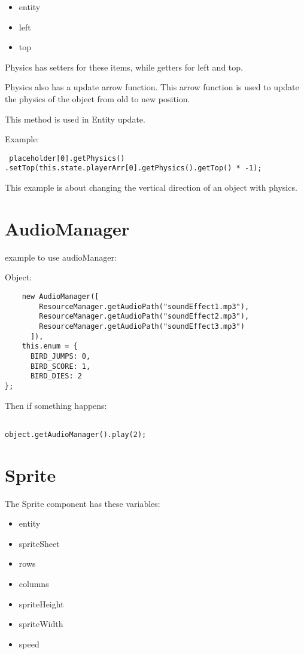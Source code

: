 \begin{itemize}
	\item entity
    \item left
    \item top
\end{itemize}

Physics has setters for these items, while getters for left and top.

Physics also has a update arrow function. This arrow function is used to update the physics of the object from old to new position. 

This method is used in Entity update.
\newpage

Example:

\begin{lstlisting}
 placeholder[0].getPhysics()
.setTop(this.state.playerArr[0].getPhysics().getTop() * -1);
\end{lstlisting}

This example is about changing the vertical direction of an object with physics.

\section{AudioManager}
example to use audioManager:

Object:
\begin{lstlisting}
    new AudioManager([
        ResourceManager.getAudioPath("soundEffect1.mp3"),
        ResourceManager.getAudioPath("soundEffect2.mp3"),
        ResourceManager.getAudioPath("soundEffect3.mp3")
      ]),    
    this.enum = {
      BIRD_JUMPS: 0,
      BIRD_SCORE: 1,
      BIRD_DIES: 2
};
\end{lstlisting}

Then if something happens:
\begin{lstlisting}

object.getAudioManager().play(2); 
\end{lstlisting}


\section{Sprite}

The Sprite component has these variables:
\begin{itemize}
	\item entity
    \item spriteSheet
    \item rows
    \item columns
    \item spriteHeight
    \item spriteWidth
    \item speed
\end{itemize}

